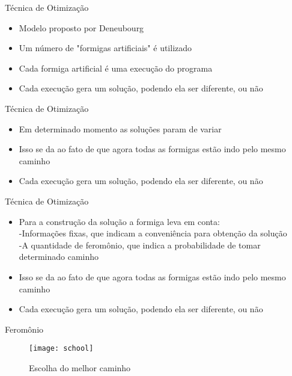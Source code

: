 \documentclass[compress]{beamer}
\begin{document}

\begin{frame}{Técnica de Otimização}
\begin{itemize}
\item{Modelo proposto por Deneubourg}
\newline
\item{Um número de "formigas artificiais" é utilizado}
\newline
\item{Cada formiga artificial é uma execução do programa}
\newline
\item{Cada execução gera um solução, podendo ela ser diferente, ou não}
\end{itemize}
\end{frame}

\begin{frame}{Técnica de Otimização}
\begin{itemize}
\item{Em determinado momento as soluções param de variar}
\newline
\item{Isso se da ao fato de que agora todas as formigas estão indo pelo mesmo caminho}
\newline
\item{Cada execução gera um solução, podendo ela ser diferente, ou não}
\end{itemize}
\end{frame}

\begin{frame}{Técnica de Otimização}
\begin{itemize}
\item{Para a construção da solução a formiga leva em conta:\\ -Informações fixas, que indicam a conveniência para obtenção da solução\\ -A quantidade de feromônio, que indica a probabilidade de tomar determinado caminho}
\newline
\item{Isso se da ao fato de que agora todas as formigas estão indo pelo mesmo caminho}
\newline
\item{Cada execução gera um solução, podendo ela ser diferente, ou não}
\end{itemize}
\end{frame}

\begin{frame}{Feromônio}
\begin{figure}[!htb]
    \centering
    \texttt{[image: school]}
    \caption{Escolha do melhor caminho}
\end{figure}
\end{frame}
\end{document}
